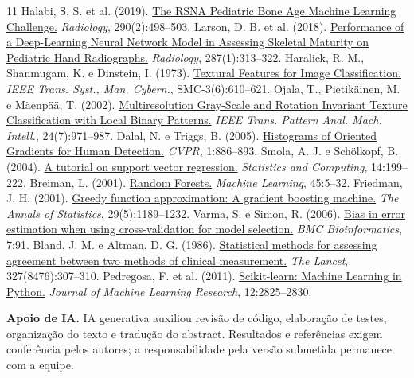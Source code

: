 \documentclass[12pt]{article}
\begin{document}
\begin{thebibliography}{11}
 Halabi, S. S. et al. (2019). \href{https://doi.org/10.1148/radiol.2018180736}{The RSNA Pediatric Bone Age Machine Learning Challenge.} \textit{Radiology}, 290(2):498--503.
 Larson, D. B. et al. (2018). \href{https://doi.org/10.1148/radiol.2017170236}{Performance of a Deep-Learning Neural Network Model in Assessing Skeletal Maturity on Pediatric Hand Radiographs.} \textit{Radiology}, 287(1):313--322.
 Haralick, R. M., Shanmugam, K. e Dinstein, I. (1973). \href{https://doi.org/10.1109/TSMC.1973.4309314}{Textural Features for Image Classification.} \textit{IEEE Trans. Syst., Man, Cybern.}, SMC-3(6):610--621.
 Ojala, T., Pietikäinen, M. e Mäenpää, T. (2002). \href{https://doi.org/10.1109/TPAMI.2002.1017623}{Multiresolution Gray-Scale and Rotation Invariant Texture Classification with Local Binary Patterns.} \textit{IEEE Trans. Pattern Anal. Mach. Intell.}, 24(7):971--987.
 Dalal, N. e Triggs, B. (2005). \href{https://doi.org/10.1109/CVPR.2005.177}{Histograms of Oriented Gradients for Human Detection.} \textit{CVPR}, 1:886--893.
 Smola, A. J. e Schölkopf, B. (2004). \href{https://doi.org/10.1023/B:STCO.0000035301.49549.88}{A tutorial on support vector regression.} \textit{Statistics and Computing}, 14:199--222.
 Breiman, L. (2001). \href{https://doi.org/10.1023/A:1010933404324}{Random Forests.} \textit{Machine Learning}, 45:5--32.
 Friedman, J. H. (2001). \href{https://doi.org/10.1214/aos/1013203451}{Greedy function approximation: A gradient boosting machine.} \textit{The Annals of Statistics}, 29(5):1189--1232.
 Varma, S. e Simon, R. (2006). \href{https://doi.org/10.1186/1471-2105-7-91}{Bias in error estimation when using cross-validation for model selection.} \textit{BMC Bioinformatics}, 7:91.
 Bland, J. M. e Altman, D. G. (1986). \href{https://doi.org/10.1016/S0140-6736(86)90837-8}{Statistical methods for assessing agreement between two methods of clinical measurement.} \textit{The Lancet}, 327(8476):307--310.
 Pedregosa, F. et al. (2011). \href{https://www.jmlr.org/papers/v12/pedregosa11a.html}{Scikit-learn: Machine Learning in Python.} \textit{Journal of Machine Learning Research}, 12:2825--2830.
\end{thebibliography}
\noindent\textbf{Apoio de IA.} IA generativa auxiliou revisão de código, elaboração de testes, organização do texto e tradução do abstract. Resultados e referências exigem conferência pelos autores; a responsabilidade pela versão submetida permanece com a equipe.
\end{document}

